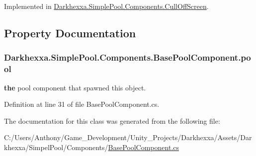 Implemented in \hyperlink{class_darkhexxa_1_1_simple_pool_1_1_components_1_1_cull_off_screen_ad85eb1ac683e2368d1aa96c18bd9d317}{Darkhexxa.\-Simple\-Pool.\-Components.\-Cull\-Off\-Screen}.



\subsection{Property Documentation}
\hypertarget{class_darkhexxa_1_1_simple_pool_1_1_components_1_1_base_pool_component_a998b7d9d011951e36f93a020fe788022}{
\subsubsection[{pool}]{ Darkhexxa.\-Simple\-Pool.\-Components.\-Base\-Pool\-Component.\-pool\hspace{0.3cm}{\ttfamily [get]}}}\label{class_darkhexxa_1_1_simple_pool_1_1_components_1_1_base_pool_component_a998b7d9d011951e36f93a020fe788022}
{\bfseries the} pool component that spawned this object. 

Definition at line 31 of file Base\-Pool\-Component.\-cs.



The documentation for this class was generated from the following file\-:\begin{DoxyCompactItemize}
\item 
C\-:/\-Users/\-Anthony/\-Game\-\_\-\-Development/\-Unity\-\_\-\-Projects/\-Darkhexxa/\-Assets/\-Darkhexxa/\-Simpel\-Pool/\-Components/\hyperlink{_base_pool_component_8cs}{Base\-Pool\-Component.\-cs}\end{DoxyCompactItemize}
